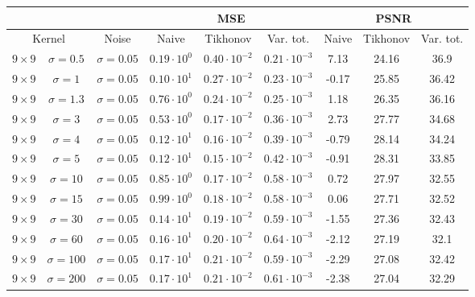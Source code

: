 \documentclass[11pt]{article}
\begin{document}
\begin{center}
    \begin{tabular}{ |cc|c|c|c|c|c|c|c| }
    \hline
    & & & \multicolumn{3}{c|}{MSE} & \multicolumn{3}{c|}{PSNR} \\
    \hline
    \multicolumn{2}{|c|}{Kernel} & Noise & Naive & Tikhonov & Var. tot. & Naive & Tikhonov & Var. tot. \\ 
    \hline
    $9 \times 9$ & $\sigma=0.5$ & $\sigma=0.05$ & $0.19 \cdot 10^{0}$ & $0.40 \cdot 10^{-2}$ & $0.21 \cdot 10^{-3}$ & 7.13 & 24.16 & 36.9 \\
	$9 \times 9$ & $\sigma=1$ & $\sigma=0.05$ & $0.10 \cdot 10^{1}$ & $0.27 \cdot 10^{-2}$ & $0.23 \cdot 10^{-3}$ & -0.17 & 25.85 & 36.42 \\
	$9 \times 9$ & $\sigma=1.3$ & $\sigma=0.05$ & $0.76 \cdot 10^{0}$ & $0.24 \cdot 10^{-2}$ & $0.25 \cdot 10^{-3}$ & 1.18 & 26.35 & 36.16 \\
    $9 \times 9$ & $\sigma=3$ & $\sigma=0.05$ & $0.53 \cdot 10^{0}$ & $0.17 \cdot 10^{-2}$ & $0.36 \cdot 10^{-3}$ & 2.73 & 27.77 & 34.68 \\
    $9 \times 9$ & $\sigma=4$ & $\sigma=0.05$ & $0.12 \cdot 10^{1}$ & $0.16 \cdot 10^{-2}$ & $0.39 \cdot 10^{-3}$ & -0.79 & 28.14 & 34.24 \\
    $9 \times 9$ & $\sigma=5$ & $\sigma=0.05$ & $0.12 \cdot 10^{1}$ & $0.15 \cdot 10^{-2}$ & $0.42 \cdot 10^{-3}$ & -0.91 & 28.31 & 33.85 \\
    $9 \times 9$ & $\sigma=10$ & $\sigma=0.05$ & $0.85 \cdot 10^{0}$ & $0.17 \cdot 10^{-2}$ & $0.58 \cdot 10^{-3}$ & 0.72 & 27.97 & 32.55 \\
    $9 \times 9$ & $\sigma=15$ & $\sigma=0.05$ & $0.99 \cdot 10^{0}$ & $0.18 \cdot 10^{-2}$ & $0.58 \cdot 10^{-3}$ & 0.06 & 27.71 & 32.52 \\
    $9 \times 9$ & $\sigma=30$ & $\sigma=0.05$ & $0.14 \cdot 10^{1}$ & $0.19 \cdot 10^{-2}$ & $0.59 \cdot 10^{-3}$ & -1.55 & 27.36 & 32.43 \\
    $9 \times 9$ & $\sigma=60$ & $\sigma=0.05$ & $0.16 \cdot 10^{1}$ & $0.20 \cdot 10^{-2}$ & $0.64 \cdot 10^{-3}$ & -2.12 & 27.19 & 32.1 \\
    $9 \times 9$ & $\sigma=100$ & $\sigma=0.05$ & $0.17 \cdot 10^{1}$ & $0.21 \cdot 10^{-2}$ & $0.59 \cdot 10^{-3}$ & -2.29 & 27.08 & 32.42 \\
	$9 \times 9$ & $\sigma=200$ & $\sigma=0.05$ & $0.17 \cdot 10^{1}$ & $0.21 \cdot 10^{-2}$ & $0.61 \cdot 10^{-3}$ & -2.38 & 27.04 & 32.29 \\
	\hline
    \end{tabular}
\end{center}
\end{document}
